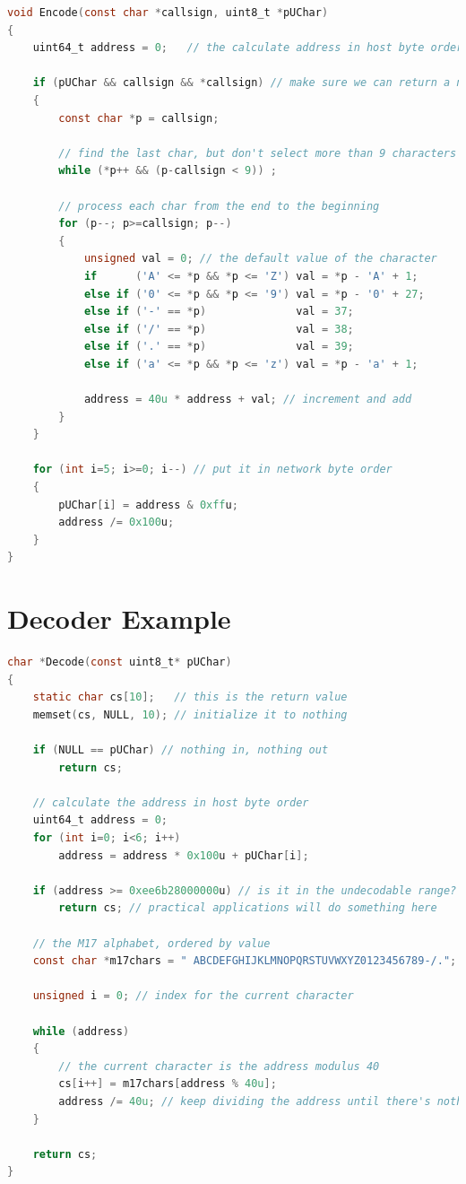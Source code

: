 \documentclass[a4paper,11pt,oneside]{book}
\begin{document}
\begin{lstlisting}[language=C,numbers=none]
void Encode(const char *callsign, uint8_t *pUChar)
{
	uint64_t address = 0;	// the calculate address in host byte order

	if (pUChar && callsign && *callsign) // make sure we can return a non-zero address
	{
		const char *p = callsign;

		// find the last char, but don't select more than 9 characters
		while (*p++ && (p-callsign < 9)) ;

		// process each char from the end to the beginning
		for (p--; p>=callsign; p--)
		{
			unsigned val = 0; // the default value of the character
			if      ('A' <= *p && *p <= 'Z') val = *p - 'A' + 1;
			else if ('0' <= *p && *p <= '9') val = *p - '0' + 27;
			else if ('-' == *p)              val = 37;
			else if ('/' == *p)              val = 38;
			else if ('.' == *p)              val = 39;
			else if ('a' <= *p && *p <= 'z') val = *p - 'a' + 1;

			address = 40u * address + val; // increment and add
		}
	}

	for (int i=5; i>=0; i--) // put it in network byte order
	{
		pUChar[i] = address & 0xffu;
		address /= 0x100u;
	}
}
\end{lstlisting}

\pagebreak

\section{Decoder Example}

\begin{lstlisting}[language=C,numbers=none]
char *Decode(const uint8_t* pUChar)
{
	static char cs[10];	  // this is the return value
	memset(cs, NULL, 10); // initialize it to nothing

	if (NULL == pUChar) // nothing in, nothing out
		return cs;

	// calculate the address in host byte order
	uint64_t address = 0;
	for (int i=0; i<6; i++)
		address = address * 0x100u + pUChar[i];

	if (address >= 0xee6b28000000u) // is it in the undecodable range?
		return cs; // practical applications will do something here

	// the M17 alphabet, ordered by value
	const char *m17chars = " ABCDEFGHIJKLMNOPQRSTUVWXYZ0123456789-/.";

	unsigned i = 0; // index for the current character

	while (address)
	{
		// the current character is the address modulus 40
		cs[i++] = m17chars[address % 40u];
		address /= 40u; // keep dividing the address until there's nothing left
	}

	return cs;
}
\end{lstlisting}
\end{document}
